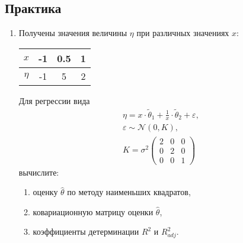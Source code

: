 \documentclass[a4paper,12pt]{article}
\begin{document}
\subsection*{Практика}

\begin{enumerate}
      \item Получены значения величины $\eta$ при различных значениях $x$:

            \begin{center}
                  \begin{tabular}{|c|c|c|c|}
                        \hline
                        $x$    & -1 & 0.5 & 1 \\
                        \hline
                        $\eta$ & -1 & 5   & 2 \\
                        \hline
                  \end{tabular}
            \end{center}

            Для регрессии вида
            \begin{gather*}
                  \eta = x \cdot \widetilde{\theta}_1 + \frac{1}{x} \cdot \widetilde{\theta}_2 + \varepsilon , \\
                  \varepsilon \sim \mathcal{N} ( 0, K ), \\
                  K =
                  \sigma^2
                  \begin{pmatrix}
                        2 & 0 & 0 \\
                        0 & 2 & 0 \\
                        0 & 0 & 1
                  \end{pmatrix}
            \end{gather*}
            вычислите:
            \begin{enumerate}
                  \item оценку $\widehat{\theta}$ по методу наименьших квадратов,
                  \item ковариационную матрицу оценки $\widehat{\theta}$,
                  \item коэффициенты детерминации $R^2$ и $R_{adj}^2$.
            \end{enumerate}


\end{enumerate}
\end{document}
